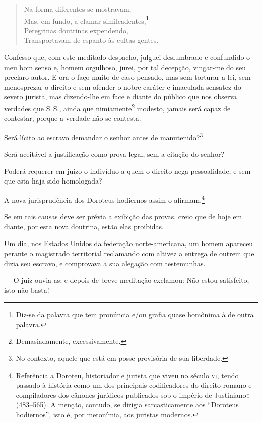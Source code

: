 \begin{verse}
Na forma diferentes se mostravam,\\
Mas, em fundo, a clamar similcadentes,\footnote{Diz-se da palavra que
  tem pronúncia e/ou grafia quase homônima à de outra palavra.}\\
Peregrinas doutrinas expendendo,\\
Transportavam de espanto às cultas gentes.
\end{verse}

Confesso que, com este meditado despacho, julguei deslumbrado e
confundido o meu bom senso e, homem orgulhoso, jurei, por tal decepção,
vingar-me do seu preclaro autor. E ora o faço muito de caso pensado, mas
sem torturar a lei, sem menosprezar o direito e sem ofender o nobre
caráter e imaculada sensatez do severo jurista, mas dizendo-lhe em face
e diante do público que nos observa verdades que S.\,S., ainda que
nimiamente\footnote{Demasiadamente, excessivamente.} modesto, jamais
será capaz de contestar, porque a verdade não se contesta.

Será lícito ao escravo demandar o senhor antes de manutenido?\footnote{
  No contexto, aquele que está em posse provisória de sua liberdade.}

Será aceitável a justificação como prova legal, sem a citação do senhor?

Poderá requerer em juízo o indivíduo a quem o direito nega pessoalidade,
e sem que esta haja sido homologada?

A nova jurisprudência dos Doroteus hodiernos assim o afirmam.\footnote{
  Referência a Doroteu, historiador e jurista que viveu no século \textsc{vi},
  tendo passado à história como um dos principais codificadores do
  direito romano e compiladores dos cânones jurídicos publicados sob o
  império de Justiniano\,\textsc{i} (483--565). A menção, contudo, se dirigia
  sarcasticamente aos ``Doroteus hodiernos'', isto é, por metonímia, aos
  juristas modernos.\label{doroteu}}

Se em tais causas deve ser prévia a exibição das provas, creio que de
hoje em diante, por esta nova doutrina, estão elas proibidas.

Um dia, nos Estados Unidos da federação norte-americana, um homem
apareceu perante o magistrado territorial reclamando com altivez a
entrega de outrem que dizia seu escravo, e comprovava a sua alegação com
testemunhas.

--- O juiz ouvia-as; e depois de breve meditação exclamou: Não estou
satisfeito, isto não basta!

